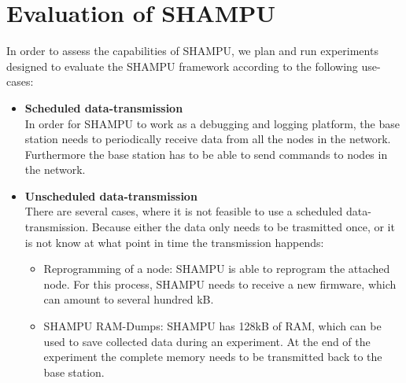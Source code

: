 \chapter{Evaluation of SHAMPU}
In order to assess the capabilities of SHAMPU, we plan and run experiments designed to evaluate the SHAMPU framework according to the following use-cases:
\begin{itemize}
	\item{\textbf{Scheduled data-transmission}} \hfill \\ In order for SHAMPU to work as a debugging and logging platform, the base station needs to periodically receive data from all the nodes in the network. Furthermore the base station has to be able to send commands to nodes in the network.
	\item{\textbf{Unscheduled data-transmission}} \hfill \\ There are several cases, where it is not feasible to use a scheduled data-transmission. Because either the data only needs to be trasmitted once, or it is not know at what point in time the transmission happends: 
	\begin{itemize}
		\item{}Reprogramming of a node: SHAMPU is able to reprogram the attached node. For this process, SHAMPU needs to receive a new firmware, which can amount to several hundred kB.
		\item{}SHAMPU RAM-Dumps: SHAMPU has 128kB of RAM, which can be used to save collected data during an experiment. At the end of the experiment the complete memory needs to be transmitted back to the base station.
	\end{itemize}
\end{itemize}
	
